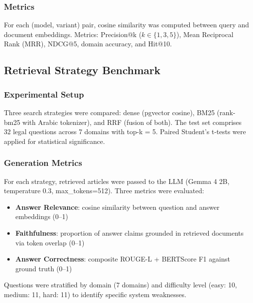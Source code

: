 \subsubsection{Metrics}

For each (model, variant) pair, cosine similarity was computed between
query and document embeddings. Metrics: Precision@k ($k \in \{1,3,5\}$),
Mean Reciprocal Rank (MRR), NDCG@5, domain accuracy, and Hit@10.

\subsection{Retrieval Strategy Benchmark}

\subsubsection{Experimental Setup}

Three search strategies were compared: dense (pgvector cosine), BM25
(rank-bm25 with Arabic tokenizer), and RRF (fusion of both). The test
set comprises 32 legal questions across 7 domains with top-k = 5.
Paired Student's t-tests were applied for statistical significance.

\subsubsection{Generation Metrics}

For each strategy, retrieved articles were passed to the LLM (Gemma 4 2B,
temperature 0.3, max\_tokens=512). Three metrics were evaluated:

\begin{itemize}
    \item \textbf{Answer Relevance}: cosine similarity between question
    and answer embeddings (0--1)
    \item \textbf{Faithfulness}: proportion of answer claims grounded in
    retrieved documents via token overlap (0--1)
    \item \textbf{Answer Correctness}: composite ROUGE-L + BERTScore F1
    against ground truth (0--1)
\end{itemize}

Questions were stratified by domain (7 domains) and difficulty level
(easy: 10, medium: 11, hard: 11) to identify specific system weaknesses.
